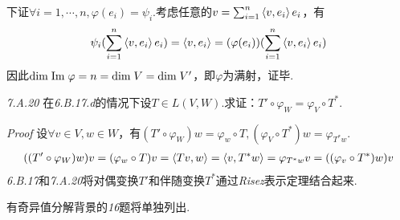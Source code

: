 下证\(\forall i=1,\cdots,n,\varphi(e_i)=\psi_i\).考虑任意的\(v=\sum_{i=1}^n \left\langle v,e_i \right\rangle e_i\)，有
    \begin{align*}
        \psi_i(\sum_{i=1}^n \left\langle v,e_i \right\rangle e_i)=\left\langle v,e_i \right\rangle=(\varphi(e_i))(\sum_{i=1}^n \left\langle v,e_i \right\rangle e_i)
    \end{align*}
因此\(\mathrm{dim \;} \mathrm{Im \;} \varphi=n=\mathrm{dim \;} V=\mathrm{dim \;} V'\)，即\(\varphi\)为满射，证毕.

\hspace*{\fill}

\textit{7.A.20}
在\textit{6.B.17.d}的情况下设\(T \in L(V,W)\).求证：\(T' \circ \varphi_W=\varphi_V \circ T^*\).

\textit{Proof}
设\(\forall v \in V,w \in W\)，有\((T' \circ \varphi_W)w=\varphi_w \circ T,(\varphi_V \circ T^*)w=\varphi_{T^*w}\).
    \begin{align*}
        ((T' \circ \varphi_W)w)v=(\varphi_w \circ T)v=\left\langle Tv,w \right\rangle
        =\left\langle v,T^*w \right\rangle=\varphi_{T^*w}v=((\varphi_v \circ T^*)w)v
    \end{align*}
\textit{6.B.17}和\textit{7.A.20}将对偶变换\(T'\)和伴随变换\(T^*\)通过\textit{Risez}表示定理结合起来.

\hspace*{\fill}

有奇异值分解背景的\textit{16}题将单独列出.

